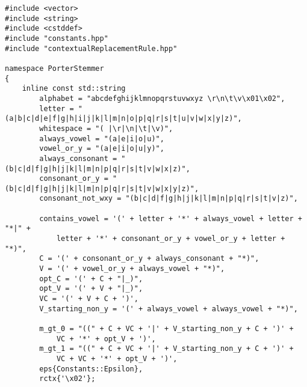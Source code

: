\documentclass{article}
\begin{document}
\begin{appendices}
\begin{verbatim}
#include <vector>
#include <string>
#include <cstddef>
#include "constants.hpp"
#include "contextualReplacementRule.hpp"

namespace PorterStemmer
{
	inline const std::string
		alphabet = "abcdefghijklmnopqrstuvwxyz \r\n\t\v\x01\x02",
		letter = "(a|b|c|d|e|f|g|h|i|j|k|l|m|n|o|p|q|r|s|t|u|v|w|x|y|z)",
		whitespace = "( |\r|\n|\t|\v)",
		always_vowel = "(a|e|i|o|u)",
		vowel_or_y = "(a|e|i|o|u|y)",
		always_consonant = "(b|c|d|f|g|h|j|k|l|m|n|p|q|r|s|t|v|w|x|z)",
		consonant_or_y = "(b|c|d|f|g|h|j|k|l|m|n|p|q|r|s|t|v|w|x|y|z)",
		consonant_not_wxy = "(b|c|d|f|g|h|j|k|l|m|n|p|q|r|s|t|v|z)",
		
		contains_vowel = '(' + letter + '*' + always_vowel + letter + "*|" +
			letter + '*' + consonant_or_y + vowel_or_y + letter + "*)",
		C = '(' + consonant_or_y + always_consonant + "*)",	
		V = '(' + vowel_or_y + always_vowel + "*)",			
		opt_C = '(' + C + "|_)",
		opt_V = '(' + V + "|_)",
		VC = '(' + V + C + ')',
		V_starting_non_y = '(' + always_vowel + always_vowel + "*)",
		
		m_gt_0 = "((" + C + VC + '|' + V_starting_non_y + C + ')' + 
			VC + '*' + opt_V + ')',
		m_gt_1 = "((" + C + VC + '|' + V_starting_non_y + C + ')' + 
			VC + VC + '*' + opt_V + ')',
		eps{Constants::Epsilon},
		rctx{'\x02'};
	

\end{verbatim}
\end{appendices}
\end{document}
